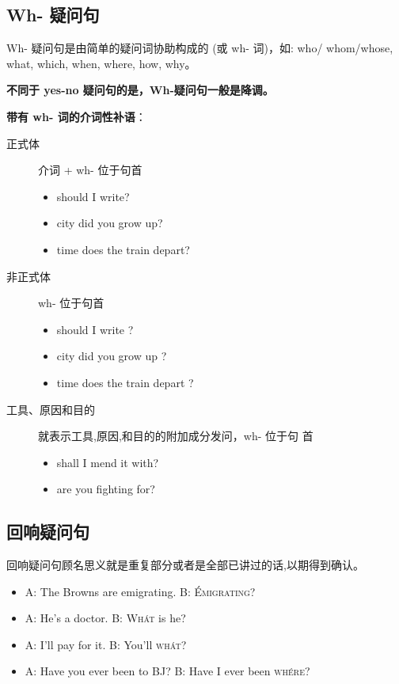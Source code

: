 \subsection{Wh- 疑问句}

Wh- 疑问句是由简单的疑问词协助构成的 (或 wh- 词)，如: who/ whom/whose,
what, which, when, where, how, why。

\textbf{不同于 yes-no 疑问句的是，Wh-疑问句一般是降调。}

\textbf{带有 wh- 词的介词性补语}：
\begin{description}
\item[正式体]介词 + wh- 位于句首
  \begin{itemize}
  \item {} should I write?
  \item {} city did you grow up?
  \item {} time does the train depart?
  \end{itemize}
\item[非正式体] wh- 位于句首
  \begin{itemize}
  \item {} should I write ?
  \item {} city did you grow up ?
  \item {} time does the train depart ?
  \end{itemize}

\item[工具、原因和目的] 就表示工具,原因,和目的的附加成分发问，wh- 位于句
  首
  \begin{itemize}
  \item {} shall I mend it with?
  \item {} are you fighting for?
  \end{itemize}
\end{description}

\subsection{回响疑问句}

回响疑问句顾名思义就是重复部分或者是全部已讲过的话,以期得到确认。
\begin{itemize}
\item A: The Browns are emigrating. \qquad B: \textsc{\'Emigrating?}
\item A: He's a doctor. \qquad B: \textsc{Wh\'at} is he?
\item A: I'll pay for it. \qquad B: You'll \textsc{wh\'at}?
\item A: Have you ever been to BJ? \qquad B: Have I ever been \textsc{wh\'ere}?
\end{itemize}

